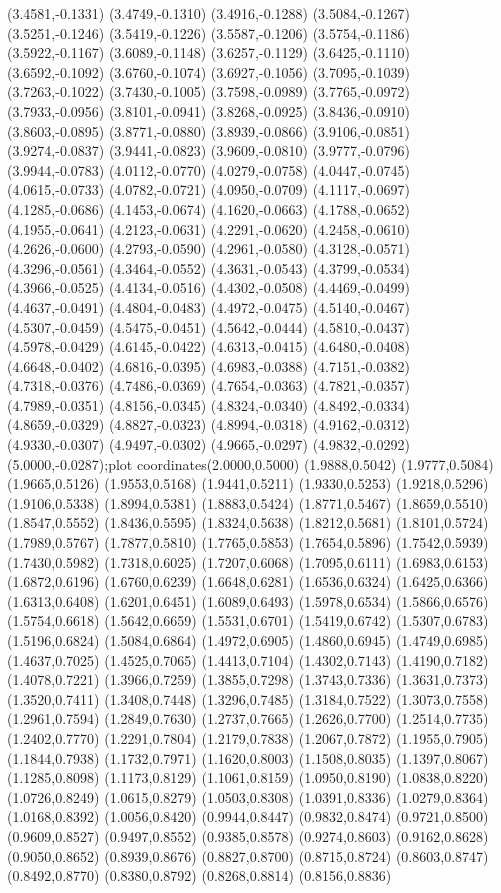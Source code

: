 {(3.4581,-0.1331) (3.4749,-0.1310) (3.4916,-0.1288) (3.5084,-0.1267) (3.5251,-0.1246) (3.5419,-0.1226) (3.5587,-0.1206) (3.5754,-0.1186) (3.5922,-0.1167) (3.6089,-0.1148) (3.6257,-0.1129) (3.6425,-0.1110) (3.6592,-0.1092) (3.6760,-0.1074) (3.6927,-0.1056) (3.7095,-0.1039) (3.7263,-0.1022) (3.7430,-0.1005) (3.7598,-0.0989) (3.7765,-0.0972) (3.7933,-0.0956) (3.8101,-0.0941) (3.8268,-0.0925) (3.8436,-0.0910) (3.8603,-0.0895) (3.8771,-0.0880) (3.8939,-0.0866) (3.9106,-0.0851) (3.9274,-0.0837) (3.9441,-0.0823) (3.9609,-0.0810) (3.9777,-0.0796) (3.9944,-0.0783) (4.0112,-0.0770) (4.0279,-0.0758) (4.0447,-0.0745) (4.0615,-0.0733) (4.0782,-0.0721) (4.0950,-0.0709) (4.1117,-0.0697) (4.1285,-0.0686) (4.1453,-0.0674) (4.1620,-0.0663) (4.1788,-0.0652) (4.1955,-0.0641) (4.2123,-0.0631) (4.2291,-0.0620) (4.2458,-0.0610) (4.2626,-0.0600) (4.2793,-0.0590) (4.2961,-0.0580) (4.3128,-0.0571) (4.3296,-0.0561) (4.3464,-0.0552) (4.3631,-0.0543) (4.3799,-0.0534) (4.3966,-0.0525) (4.4134,-0.0516) (4.4302,-0.0508) (4.4469,-0.0499) (4.4637,-0.0491) (4.4804,-0.0483) (4.4972,-0.0475) (4.5140,-0.0467) (4.5307,-0.0459) (4.5475,-0.0451) (4.5642,-0.0444) (4.5810,-0.0437) (4.5978,-0.0429) (4.6145,-0.0422) (4.6313,-0.0415) (4.6480,-0.0408) (4.6648,-0.0402) (4.6816,-0.0395) (4.6983,-0.0388) (4.7151,-0.0382) (4.7318,-0.0376) (4.7486,-0.0369) (4.7654,-0.0363) (4.7821,-0.0357) (4.7989,-0.0351) (4.8156,-0.0345) (4.8324,-0.0340) (4.8492,-0.0334) (4.8659,-0.0329) (4.8827,-0.0323) (4.8994,-0.0318) (4.9162,-0.0312) (4.9330,-0.0307) (4.9497,-0.0302) (4.9665,-0.0297) (4.9832,-0.0292) (5.0000,-0.0287)};plot coordinates{(2.0000,0.5000) (1.9888,0.5042) (1.9777,0.5084) (1.9665,0.5126) (1.9553,0.5168) (1.9441,0.5211) (1.9330,0.5253) (1.9218,0.5296) (1.9106,0.5338) (1.8994,0.5381) (1.8883,0.5424) (1.8771,0.5467) (1.8659,0.5510) (1.8547,0.5552) (1.8436,0.5595) (1.8324,0.5638) (1.8212,0.5681) (1.8101,0.5724) (1.7989,0.5767) (1.7877,0.5810) (1.7765,0.5853) (1.7654,0.5896) (1.7542,0.5939) (1.7430,0.5982) (1.7318,0.6025) (1.7207,0.6068) (1.7095,0.6111) (1.6983,0.6153) (1.6872,0.6196) (1.6760,0.6239) (1.6648,0.6281) (1.6536,0.6324) (1.6425,0.6366) (1.6313,0.6408) (1.6201,0.6451) (1.6089,0.6493) (1.5978,0.6534) (1.5866,0.6576) (1.5754,0.6618) (1.5642,0.6659) (1.5531,0.6701) (1.5419,0.6742) (1.5307,0.6783) (1.5196,0.6824) (1.5084,0.6864) (1.4972,0.6905) (1.4860,0.6945) (1.4749,0.6985) (1.4637,0.7025) (1.4525,0.7065) (1.4413,0.7104) (1.4302,0.7143) (1.4190,0.7182) (1.4078,0.7221) (1.3966,0.7259) (1.3855,0.7298) (1.3743,0.7336) (1.3631,0.7373) (1.3520,0.7411) (1.3408,0.7448) (1.3296,0.7485) (1.3184,0.7522) (1.3073,0.7558) (1.2961,0.7594) (1.2849,0.7630) (1.2737,0.7665) (1.2626,0.7700) (1.2514,0.7735) (1.2402,0.7770) (1.2291,0.7804) (1.2179,0.7838) (1.2067,0.7872) (1.1955,0.7905) (1.1844,0.7938) (1.1732,0.7971) (1.1620,0.8003) (1.1508,0.8035) (1.1397,0.8067) (1.1285,0.8098) (1.1173,0.8129) (1.1061,0.8159) (1.0950,0.8190) (1.0838,0.8220) (1.0726,0.8249) (1.0615,0.8279) (1.0503,0.8308) (1.0391,0.8336) (1.0279,0.8364) (1.0168,0.8392) (1.0056,0.8420) (0.9944,0.8447) (0.9832,0.8474) (0.9721,0.8500) (0.9609,0.8527) (0.9497,0.8552) (0.9385,0.8578) (0.9274,0.8603) (0.9162,0.8628) (0.9050,0.8652) (0.8939,0.8676) (0.8827,0.8700) (0.8715,0.8724) (0.8603,0.8747) (0.8492,0.8770) (0.8380,0.8792) (0.8268,0.8814) (0.8156,0.8836) }

